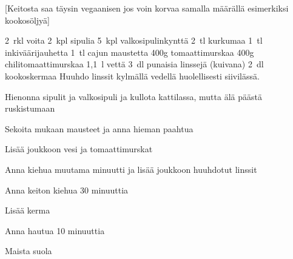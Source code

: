 [Keitosta saa täysin vegaanisen jos voin korvaa samalla määrällä esimerkiksi kookosöljyä]

\begin{step}
2~rkl voita
2~kpl sipulia
5~kpl valkosipulinkynttä
2~tl kurkumaa
1~tl inkiväärijauhetta
1~tl cajun maustetta
400g tomaattimurskaa
400g chilitomaattimurskaa
1,1~l vettä
3~dl punaisia linssejä (kuivana)
2~dl kookoskermaa
\method
Huuhdo linssit kylmällä vedellä huolellisesti siivilässä.

Hienonna sipulit ja valkosipuli ja kullota kattilassa, mutta älä päästä ruskistumaan

Sekoita mukaan mausteet ja anna hieman paahtua

Lisää joukkoon vesi ja tomaattimurskat

Anna kiehua muutama minuutti ja lisää joukkoon huuhdotut linssit

Anna keiton kiehua 30 minuuttia

Lisää kerma

Anna hautua 10 minuuttia

Maista suola
\end{step}
